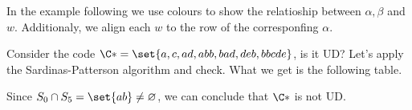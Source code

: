 \documentclass{subfiles}
\begin{document}
    In the example following we use colours to show the relatioship between \(\alpha, \beta\)
    and \(w\). Additionaly, we align each \(w\) to the row of the corresponfing \(\alpha\).
    \clearpage 

    \begin{example*}
        Consider the code \(\C* = \set{a, c, ad, abb, bad, deb, bbcde}\), is it UD?
            Let's apply the Sardinas-Patterson algorithm and check. 
            What we get is the following table.

            

            \noindent Since \(S_{0} \cap S_{5} = \set{ab} \ne \varnothing\),
            we can conclude that \(\C*\) is not UD.
    \end{example*}
\end{document}
